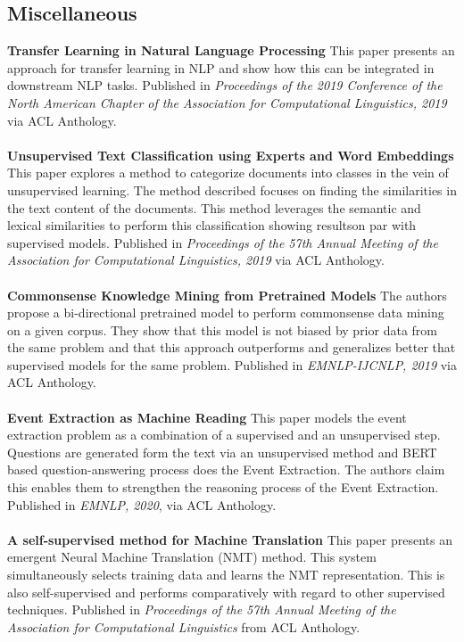 \documentclass[a4]{article}
\begin{document}
\subsection*{Miscellaneous}
\textbf{Transfer Learning in Natural Language Processing} \cite{transferLearn} This paper presents an approach for transfer learning in NLP and show how this can be integrated in downstream NLP tasks. Published in \textit{Proceedings of the 2019 Conference of the North {A}merican Chapter of the Association for Computational Linguistics, 2019} via ACL Anthology.
\\
\\
\textbf{Unsupervised Text Classification using Experts and Word Embeddings}
\cite{unsupervisedClass} This paper explores a method to categorize documents into classes in the vein of unsupervised learning. The method described focuses on finding the similarities in the text content of the documents. This method leverages the semantic and lexical similarities to perform this classification showing resultson par with supervised models. Published in \textit{Proceedings of the 57th Annual Meeting of the Association for Computational Linguistics, 2019} via ACL Anthology.
\\
\\
\textbf{Commonsense Knowledge Mining from Pretrained Models} \cite{commonsense} The authors propose a bi-directional pretrained model to perform commonsense data mining on a given corpus. They show that this model is not biased by prior data from the same problem and that this approach outperforms and generalizes better that supervised models for the same problem. Published in \textit{EMNLP-IJCNLP, 2019} via ACL Anthology. 
\\
\\
\textbf{Event Extraction as Machine Reading} \cite{eventExtract} This paper models the event extraction problem as a combination of a supervised and an unsupervised step. Questions are generated form the text via an unsupervised method and BERT based question-answering process does the Event Extraction. The authors claim this enables them to strengthen the reasoning process of the Event Extraction. Published in \textit{EMNLP, 2020}, via ACL Anthology.
\\
\\
\textbf{A self-supervised method for Machine Translation} \cite{selfSuper} This paper presents an emergent Neural Machine Translation (NMT) method. This system simultaneously selects training data and learns the NMT representation. This is also self-supervised and performs comparatively with regard to other supervised techniques. Published in \textit{Proceedings of the 57th Annual Meeting of the Association for Computational Linguistics} from ACL Anthology.
\end{document}
